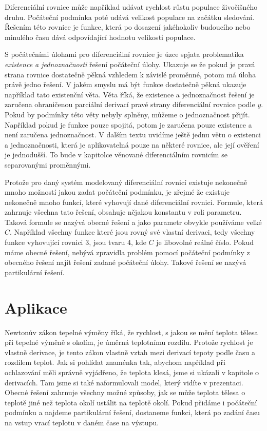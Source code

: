 \documentclass[12pt]{article}
\begin{document}
Diferenciální rovnice může například udávat rychlost růstu populace živočišného druhu. Počáteční podmínka poté udává velikost populace na začátku sledování. Řešením této rovnice je funkce, která po dosazení jakéhokoliv budoucího nebo minulého času dává odpovídající hodnotu velikosti populace. 

S počátečními úlohami pro diferenciální rovnice je úzce spjata problematika \textit{existence a jednoznačnosti} řešení počáteční úlohy. Ukazuje se že pokud je pravá strana rovnice dostatečně pěkná vzhledem k závislé proměnné, potom má úloha právě jedno řešení. V jakém smyslu má být funkce dostatečně pěkná ukazuje například tato existenční věta. Věta říká, že existence a jednoznačnost řešení je zaručena ohraničenou parciální derivací pravé strany diferenciální rovnice podle $y$. Pokud by podmínky této věty nebyly splněny, můžeme o jednoznačnost přijít. Například pokud je funkce pouze spojitá, potom je zaručena pouze existence a není zaručena jednoznačnost. V dalším textu uvidíme ještě jednu větu o existenci a jednoznačnosti, která je aplikovatelná pouze na některé rovnice, ale její ověření je jednodušší. To bude v kapitolce věnované diferenciálním rovnicím se separovanými proměnnými. 

Protože pro daný systém modelovaný diferenciální rovnicí existuje nekonečně mnoho možností jakou zadat počáteční podmínku, je zřejmé že existuje nekonečně mnoho funkcí, které vyhovují dané diferenciální rovnici. Formule, která zahrnuje všechna tato řešení, obsahuje nějakou konstantu v roli parametru. Taková formule se nazývá obecné řešení a jako parametr obvykle používáme velké $C$. Například všechny funkce které jsou rovný své vlastní derivaci, tedy všechny funkce vyhovující rovnici 3, jsou tvaru 4, kde $C$ je libovolné reálné číslo. Pokud máme obecné řešení, nebývá zpravidla problém pomocí počáteční podmínky z obecného řešení najít řešení zadané počáteční úlohy. Takové řešení se nazývá partikulární řešení.

\section*{Aplikace}

Newtonův zákon tepelné výměny říká, že rychlost, s jakou se mění teplota tělesa při tepelné výměně s okolím, je úměrná teplotnímu rozdílu. Protože rychlost je vlastně derivace, je tento zákon vlastně vztah mezi derivací tepoty podle času a rozdílem teplot. Jak si pohlídat znaménka tak, abychom například při ochlazování měli správně vyjádřeno, že teplota klesá, jsme si ukázali v kapitole o derivacích. Tam jsme si také naformulovali model, který vidíte v prezentaci. Obecné řešení zahrnuje všechny možné způsoby, jak se může teplota tělesa o teplotě jiné než teplota okolí ustálit na teplotě okolí. Pokud přidáme i počáteční podmínku a najdeme partikulární řešení, dostaneme funkci, která po zadání času na vstup vrací teplotu v daném čase na výstupu.
\end{document}
